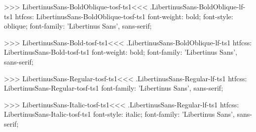{{{{>>>
\<LibertinusSans-BoldOblique-tosf-ts1\><<<
.LibertinusSans-BoldOblique-lf-ts1
htfcss:  LibertinusSans-BoldOblique-tosf-ts1  font-weight: bold; font-style: oblique; font-family: 'Libertinus Sans', sans-serif;

>>>
\<LibertinusSans-Bold-tosf-ts1\><<<
.LibertinusSans-BoldOblique-lf-ts1
htfcss:  LibertinusSans-Bold-tosf-ts1  font-weight: bold; font-family: 'Libertinus Sans', sans-serif;

>>>
\<LibertinusSans-Regular-tosf-ts1\><<<
.LibertinusSans-Regular-lf-ts1
htfcss:  LibertinusSans-Regular-tosf-ts1  font-family: 'Libertinus Sans', sans-serif;

>>>
\<LibertinusSans-Italic-tosf-ts1\><<<
.LibertinusSans-Regular-lf-ts1
htfcss:  LibertinusSans-Italic-tosf-ts1  font-style: italic; font-family: 'Libertinus Sans', sans-serif;

}}}}
